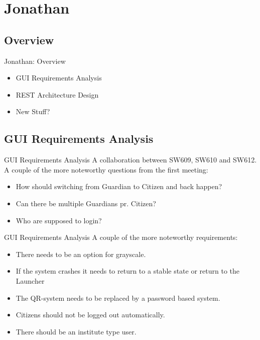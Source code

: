 \section{Jonathan}
\subsection{Overview}
\begin{frame}{Jonathan: Overview}
\begin{itemize}
\item GUI Requirements Analysis
\item REST Architecture Design
\item New Stuff?
\end{itemize}
\end{frame}

\subsection{GUI Requirements Analysis}
\begin{frame}{GUI Requirements Analysis}
A collaboration between SW609, SW610 and SW612.\\

A couple of the more noteworthy questions from the first meeting:
\begin{itemize}
\item How should switching from Guardian to Citizen and back happen?
\item Can there be multiple Guardians pr. Citizen?
\item Who are supposed to login?
\end{itemize}

\end{frame}

\begin{frame}[fragile]{GUI Requirements Analysis}
A couple of the more noteworthy requirements:

\begin{itemize}
\item There needs to be an option for grayscale.
\item If the system crashes it needs to return to a stable state or return to the Launcher
\item The QR-system needs to be replaced by a password based system.
\item Citizens should not be logged out automatically.
\item There should be an institute type user.
\end{itemize}
\end{frame}

